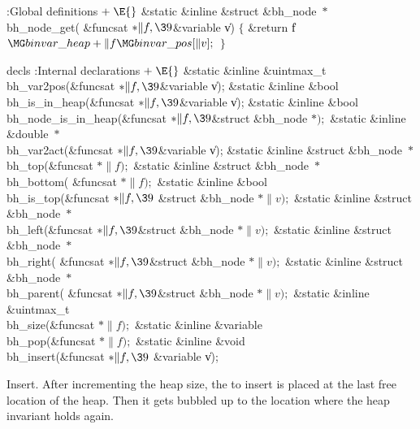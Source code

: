 \Y\B\4:Global definitions\X${}\mathrel+\E{}$\6
\&{static} \&{inline} \&{struct} \&{bh\_node} ${}{*}{}$\\{bh\_node\_get}(%
\&{funcsat} ${}{*}\|f,\39{}$\&{variable} \|v)\1\1\2\2\6
${}\{{}$\1\6
\&{return} \|f${}\MG\\{binvar\_heap}+\|f\MG\\{binvar\_pos}[\|v];{}$\6
\4${}\}{}$\2\par
\fi

decls
\Y\B\4:Internal declarations\X${}\mathrel+\E{}$\6
\&{static} \&{inline} \&{uintmax\_t} \\{bh\_var2pos}(\&{funcsat} ${}{*}\|f,%
\39{}$\&{variable} \|v);\6
\&{static} \&{inline} \&{bool} \\{bh\_is\_in\_heap}(\&{funcsat} ${}{*}\|f,%
\39{}$\&{variable} \|v);\6
\&{static} \&{inline} \&{bool} \\{bh\_node\_is\_in\_heap}(\&{funcsat} ${}{*}%
\|f,\39{}$\&{struct} \&{bh\_node} ${}{*});{}$\6
\&{static} \&{inline} \&{double} ${}{*}{}$\\{bh\_var2act}(\&{funcsat} ${}{*}%
\|f,\39{}$\&{variable} \|v);\6
\&{static} \&{inline} \&{struct} \&{bh\_node} ${}{*}{}$\\{bh\_top}(\&{funcsat}
${}{*}\|f);{}$\6
\&{static} \&{inline} \&{struct} \&{bh\_node} ${}{*}{}$\\{bh\_bottom}(%
\&{funcsat} ${}{*}\|f);{}$\6
\&{static} \&{inline} \&{bool} \\{bh\_is\_top}(\&{funcsat} ${}{*}\|f,\39{}$%
\&{struct} \&{bh\_node} ${}{*}\|v);{}$\6
\&{static} \&{inline} \&{struct} \&{bh\_node} ${}{*}{}$\\{bh\_left}(\&{funcsat}
${}{*}\|f,\39{}$\&{struct} \&{bh\_node} ${}{*}\|v);{}$\6
\&{static} \&{inline} \&{struct} \&{bh\_node} ${}{*}{}$\\{bh\_right}(%
\&{funcsat} ${}{*}\|f,\39{}$\&{struct} \&{bh\_node} ${}{*}\|v);{}$\6
\&{static} \&{inline} \&{struct} \&{bh\_node} ${}{*}{}$\\{bh\_parent}(%
\&{funcsat} ${}{*}\|f,\39{}$\&{struct} \&{bh\_node} ${}{*}\|v);{}$\6
\&{static} \&{inline} \&{uintmax\_t} \\{bh\_size}(\&{funcsat} ${}{*}\|f);{}$\6
\&{static} \&{inline} \&{variable} \\{bh\_pop}(\&{funcsat} ${}{*}\|f);{}$\6
\&{static} \&{inline} \&{void} \\{bh\_insert}(\&{funcsat} ${}{*}\|f,\39{}$%
\&{variable} \|v);\par
\fi

Insert. After incrementing the heap size, the to insert is placed at the
last
free location of the heap. Then it gets bubbled up to the location where the
heap invariant holds again.

